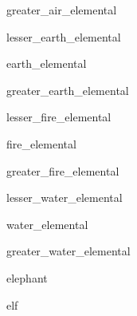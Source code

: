 \documentclass[letterpaper,serif]{module}
\begin{document}
\begin{newmonster}{greater_air_elemental}\end{newmonster}

\begin{newmonster}{lesser_earth_elemental}\end{newmonster}

\begin{newmonster}{earth_elemental}\end{newmonster}

\begin{newmonster}{greater_earth_elemental}\end{newmonster}

\begin{newmonster}{lesser_fire_elemental}\end{newmonster}

\begin{newmonster}{fire_elemental}\end{newmonster}

\begin{newmonster}{greater_fire_elemental}\end{newmonster}

\begin{newmonster}{lesser_water_elemental}\end{newmonster}

\begin{newmonster}{water_elemental}\end{newmonster}

\begin{newmonster}{greater_water_elemental}\end{newmonster}

\begin{newmonster}{elephant}\end{newmonster}

\begin{newmonster}{elf}\end{newmonster}
\end{document}
